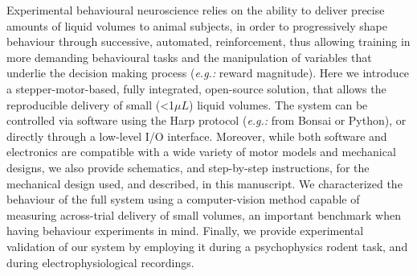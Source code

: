 Experimental behavioural neuroscience relies on the ability to deliver precise amounts of liquid volumes to animal subjects, in order to progressively shape behaviour through successive, automated, reinforcement, thus allowing training in more demanding behavioural tasks and the manipulation of variables that underlie the decision making process (\textit{e.g.:} reward magnitude).
Here we introduce a stepper-motor-based, fully integrated, open-source solution, that allows the reproducible delivery of small (<1$\mu L$) liquid volumes.
The system can be controlled via software using the Harp protocol (\textit{e.g.:} from Bonsai or Python), or directly through a low-level I/O interface. Moreover, while both software and electronics are compatible with a wide variety of motor models and mechanical designs, we also provide schematics, and step-by-step instructions, for the mechanical design used, and described, in this manuscript.
We characterized the behaviour of the full system using a computer-vision method capable of measuring across-trial delivery of small volumes, an important benchmark when having behaviour experiments in mind. Finally, we provide experimental validation of our system by employing it during a psychophysics rodent task, and during electrophysiological recordings.
